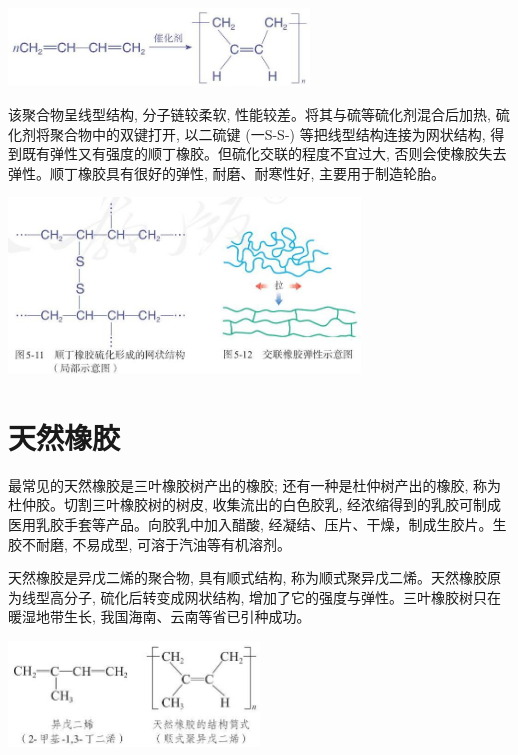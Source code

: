 \documentclass[10pt]{article}
\begin{document}
\begin{center}
\includegraphics[max width=0.6\textwidth]{images/0190efc5-b58a-7c43-bfb0-e0a030df9cfd_149_139044.jpg}
\end{center}

该聚合物呈线型结构, 分子链较柔软, 性能较差。将其与硫等硫化剂混合后加热, 硫化剂将聚合物中的双键打开, 以二硫键 (一S-S-) 等把线型结构连接为网状结构, 得到既有弹性又有强度的顺丁橡胶。但硫化交联的程度不宜过大, 否则会使橡胶失去弹性。顺丁橡胶具有很好的弹性, 耐磨、耐寒性好, 主要用于制造轮胎。

\begin{center}
\includegraphics[max width=0.7\textwidth]{images/0190efc5-b58a-7c43-bfb0-e0a030df9cfd_149_229155.jpg}
\end{center}

\section*{天然橡胶}

最常见的天然橡胶是三叶橡胶树产出的橡胶; 还有一种是杜仲树产出的橡胶, 称为杜仲胶。切割三叶橡胶树的树皮, 收集流出的白色胶乳, 经浓缩得到的乳胶可制成医用乳胶手套等产品。向胶乳中加入醋酸, 经凝结、压片、干燥，制成生胶片。生胶不耐磨, 不易成型, 可溶于汽油等有机溶剂。

天然橡胶是异戊二烯的聚合物, 具有顺式结构, 称为顺式聚异戊二烯。天然橡胶原为线型高分子, 硫化后转变成网状结构, 增加了它的强度与弹性。三叶橡胶树只在暖湿地带生长, 我国海南、云南等省已引种成功。

\begin{center}
\includegraphics[max width=0.5\textwidth]{images/0190efc5-b58a-7c43-bfb0-e0a030df9cfd_150_236458.jpg}
\end{center}
\end{document}
